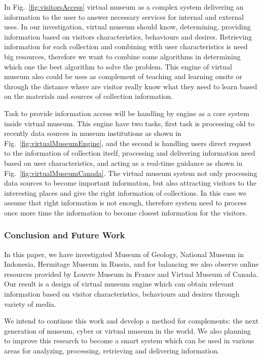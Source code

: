 In Fig.~\cref{fig:visitorsAccess} virtual museum as a complex system delivering an information to the user to answer necessary services for internal and external uses. In our investigation, virtual museum should know, determining, providing information based on visitors characteristics, behaviours and desires. Retrieving information for each collection and combining with user characteristics is need big resources, therefore we want to combine some algorithms in determining which one the best algorithm to solve the problem. This engine of virtual museum also could be uses as complement of teaching and learning onsite or through the distance where are visitor really know what they need to learn based on the materials and sources of collection information.

Task to provide information access will be handling by engine as a core system inside virtual museum. This engine have two tasks, first task is processing old to recently data sources in museum institutions as shown in Fig.~\cref{fig:virtualMuseumEngine}, and the second is handling users direct request to the information of collection itself, processing and delivering information need based on user characteristics, and acting as a real-time guidance as shown in Fig.~\cref{fig:virtualMuseumCanada}. The virtual museum system not only processing data sources to become important information, but also attracting visitors to the interesting places and give the right information of collections. In this case we assume that right information is not enough, therefore system need to process once more time the information to become closest information for the visitors.

\subsubsection{Conclusion and Future Work}

In this paper, we have investigated Museum of Geology, National Museum in Indonesia, Hermitage Museum in Russia, and for balancing we also observe online resources provided by Louvre Museum in France and Virtual Museum of Canada. Our result is a design of virtual museum engine which can obtain relevant information based on visitor characteristics, behaviours and desires through variety of media.

We intend to continue this work and develop a method for complements: the next generation of museum, cyber or virtual museum in the world. We also planning to improve this research to become a smart system which can be used in various areas for analyzing, processing, retrieving and delivering information.

